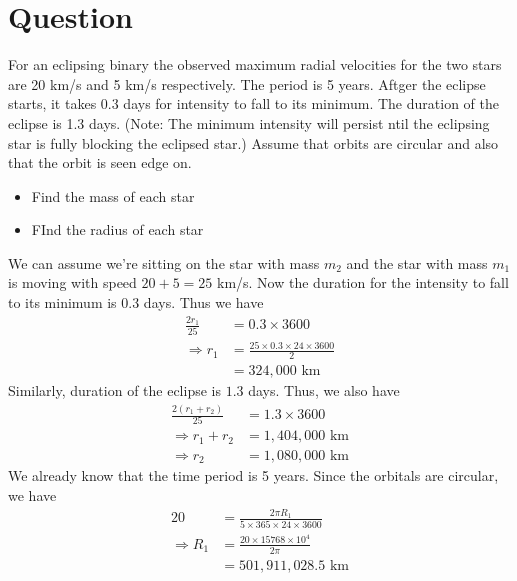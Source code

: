 \documentclass[paper=a4, fontsize=11pt]{scrartcl} %
\numberwithin{equation}{section} %
\numberwithin{figure}{section} %
\numberwithin{table}{section} %
\begin{document}
\section{Question}
	For an eclipsing binary the observed maximum radial velocities for the two stars are 20 km/s and 5 km/s respectively. The period is 5 years. Aftger the eclipse starts, it takes 0.3 days for intensity to fall to its minimum. The duration of the eclipse is 1.3 days. (Note: The minimum intensity will persist ntil the eclipsing star is fully blocking the eclipsed star.) Assume that orbits are circular and also that the orbit is seen edge on.
	\begin{itemize}
		\item Find the mass of each star
		\item FInd the radius of each star
	\end{itemize}
	\par
	We can assume we're sitting on the star with mass $m_2$ and the star with mass $m_1$ is moving with speed $20 + 5 = 25$ km/s. Now the duration for the intensity to fall to its minimum is 0.3 days. Thus we have
	\begin{equation}
	\begin{split}
		\frac{2r_1}{25}& =0.3\times 3600 \\
		\Rightarrow r_1 &=\frac{25\times 0.3 \times 24 \times 3600}{2}\\
		&=324,000 \text{ km}
	\end{split}
	\end{equation}
	Similarly, duration of the eclipse is $1.3$ days. Thus, we also have
	\begin{equation}
	\begin{split}
		\frac{2(r_1+r_2)}{25}& =1.3\times 3600 \\
		\Rightarrow r_1+r_2 &=1,404,000 \text{ km} \\
		\Rightarrow r_2 &=1,080,000 \text{ km}
	\end{split}
	\end{equation}	
	We already know that the time period is 5 years. Since the orbitals are circular, we have
	\begin{equation}
	\begin{split}
		20 &= \frac{2\pi R_1}{5\times 365\times 24\times 3600} \\
		\Rightarrow R_1 &=\frac{20\times 15768 \times 10^4}{2\pi} \\
		&=501,911,028.5 \text{ km}
	\end{split}
	\end{equation}
\end{document}
